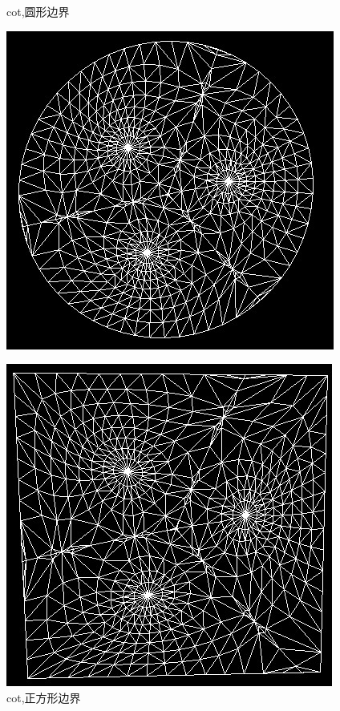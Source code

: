 \documentclass{article}
\begin{document}
	\begin{figure}[htbp]
		\centering
		\begin{minipage}{0.24\linewidth}
			\centering
			\caption{cot,圆形边界}
			\includegraphics[width=1\linewidth]{balls_circle.JPG}
			\label{chutian1}%
		\end{minipage}
		\begin{minipage}{0.24\linewidth}
			\centering
			\caption{cot,正方形边界}
			\includegraphics[width=1\linewidth]{balls_square.JPG}

\end{minipage}
\end{figure}
\end{document}
